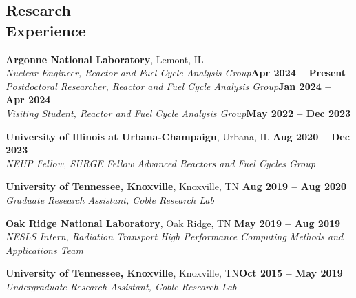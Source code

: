 \documentclass[margin,line]{resume}
\begin{document}
\begin{resume}
    \section{\mysidestyle Research\\Experience}
    \textbf{Argonne National Laboratory}, Lemont, IL\\
    \vspace{0mm}
        \textsl{Nuclear Engineer, Reactor and Fuel Cycle Analysis Group}\hfill\textbf{Apr 2024 -- Present}\\\vspace{0mm}
        \textsl{Postdoctoral Researcher, Reactor and Fuel Cycle Analysis Group}\hfill\textbf{Jan 2024 -- Apr 2024}\\\vspace{-2mm}
        \textsl{Visiting Student, Reactor and Fuel Cycle Analysis Group}\hfill\textbf{May 2022 -- Dec 2023}\\\vspace{-6mm}

    \textbf{University of Illinois at Urbana-Champaign}, Urbana, IL \hfill \textbf{Aug 2020 -- Dec 2023} \\
    \vspace{-6mm}
        \textsl{NEUP Fellow, SURGE Fellow Advanced Reactors and Fuel Cycles Group} \\\vspace{-2mm}
        
    \textbf{University of Tennessee, Knoxville}, Knoxville, TN \hfill \textbf{Aug 2019 -- Aug 2020}\\
    \vspace{-6mm}
        \textsl{Graduate Research Assistant, Coble Research Lab} \\ \vspace{-2mm}
    
    \textbf{Oak Ridge National Laboratory}, Oak Ridge, TN \hfill \textbf{May 2019 -- Aug 2019}\\
    \vspace{-6mm}        
        \textsl{NESLS Intern, Radiation Transport High Performance Computing Methods and Applications Team}\\ \vspace{-2mm}              
    
    \textbf{University of Tennessee, Knoxville}, Knoxville, TN\hfill\textbf{Oct 2015 -- May 2019}\\
    \vspace{-6mm}            
        \textsl{Undergraduate Research Assistant, Coble Research Lab}\\\vspace{-2mm}


\end{resume}
\end{document}
